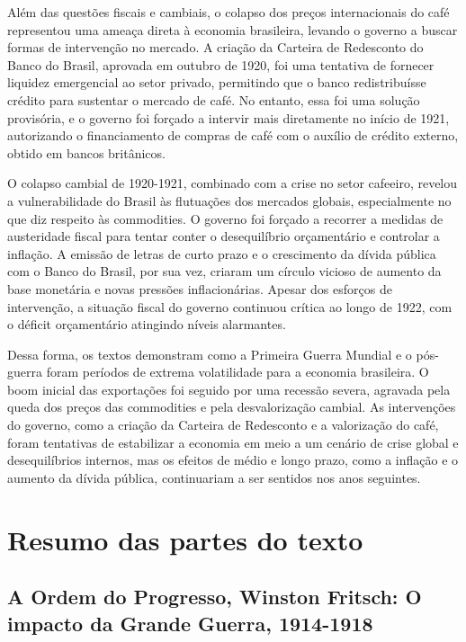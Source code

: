\documentclass[a4paper,12pt]{article}[abntex2]
\begin{document}
Além das questões fiscais e cambiais, o colapso dos preços internacionais do café representou uma ameaça direta à economia brasileira, levando o governo a buscar formas de intervenção no mercado. A criação da Carteira de Redesconto do Banco do Brasil, aprovada em outubro de 1920, foi uma tentativa de fornecer liquidez emergencial ao setor privado, permitindo que o banco redistribuísse crédito para sustentar o mercado de café. No entanto, essa foi uma solução provisória, e o governo foi forçado a intervir mais diretamente no início de 1921, autorizando o financiamento de compras de café com o auxílio de crédito externo, obtido em bancos britânicos.

O colapso cambial de 1920-1921, combinado com a crise no setor cafeeiro, revelou a vulnerabilidade do Brasil às flutuações dos mercados globais, especialmente no que diz respeito às commodities. O governo foi forçado a recorrer a medidas de austeridade fiscal para tentar conter o desequilíbrio orçamentário e controlar a inflação. A emissão de letras de curto prazo e o crescimento da dívida pública com o Banco do Brasil, por sua vez, criaram um círculo vicioso de aumento da base monetária e novas pressões inflacionárias. Apesar dos esforços de intervenção, a situação fiscal do governo continuou crítica ao longo de 1922, com o déficit orçamentário atingindo níveis alarmantes.

Dessa forma, os textos demonstram como a Primeira Guerra Mundial e o pós-guerra foram períodos de extrema volatilidade para a economia brasileira. O boom inicial das exportações foi seguido por uma recessão severa, agravada pela queda dos preços das commodities e pela desvalorização cambial. As intervenções do governo, como a criação da Carteira de Redesconto e a valorização do café, foram tentativas de estabilizar a economia em meio a um cenário de crise global e desequilíbrios internos, mas os efeitos de médio e longo prazo, como a inflação e o aumento da dívida pública, continuariam a ser sentidos nos anos seguintes.

\newpage
\section{\textbf{Resumo das partes do texto}}

\subsection{\textbf{A Ordem do Progresso, Winston Fritsch: O impacto da Grande Guerra, 1914-1918}}
\end{document}
